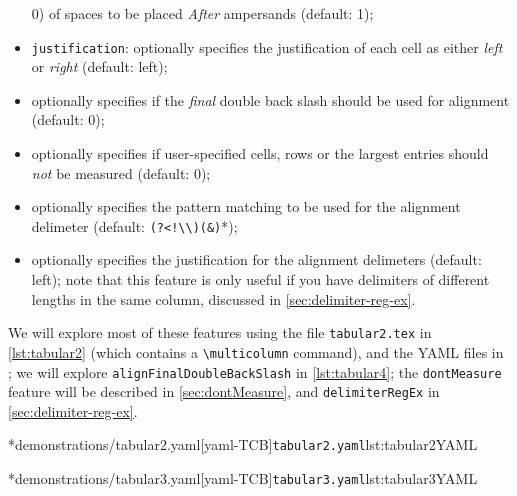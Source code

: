 \begin{itemize}
		      0) of spaces to be placed \emph{After} ampersands (default: 1);
		\item {}\texttt{justification}: optionally specifies the justification of each cell as
		      either \emph{left} or \emph{right} (default: left);
		\item {}
		      optionally specifies if the \emph{final} double back slash should be used for alignment
		      (default: 0);
		\item {} optionally specifies if
		      user-specified cells, rows or the largest entries should \emph{not} be measured (default:
		      0);
		\item {} optionally specifies the
		      pattern matching to be used for the alignment delimeter (default:
		      \lstinline* '(?<!\\)(&)'*);
		\item {} optionally
		      specifies the justification for the alignment delimeters (default: left); note that this
		      feature is only useful if you have delimiters of different lengths in the same column,
		      discussed in \cref{sec:delimiter-reg-ex}.
	\end{itemize}

	We will explore most of these features using the file \texttt{tabular2.tex} in
	\cref{lst:tabular2} (which contains a \lstinline!\multicolumn! command), and the YAML
	files in ; we will explore
	\texttt{alignFinalDoubleBackSlash} in \cref{lst:tabular4}; the \texttt{dontMeasure}
	feature will be described in \cref{sec:dontMeasure}, and \texttt{delimiterRegEx} in
	\cref{sec:delimiter-reg-ex}.

	\begin{minipage}{.45\textwidth}
		\cmhlistingsfromfile[style=yaml-LST]*{demonstrations/tabular2.yaml}[yaml-TCB]{\texttt{tabular2.yaml}}{lst:tabular2YAML}
	\end{minipage}%
	\hfill
	\begin{minipage}{.48\textwidth}
		\cmhlistingsfromfile[style=yaml-LST]*{demonstrations/tabular3.yaml}[yaml-TCB]{\texttt{tabular3.yaml}}{lst:tabular3YAML}
	\end{minipage}%

